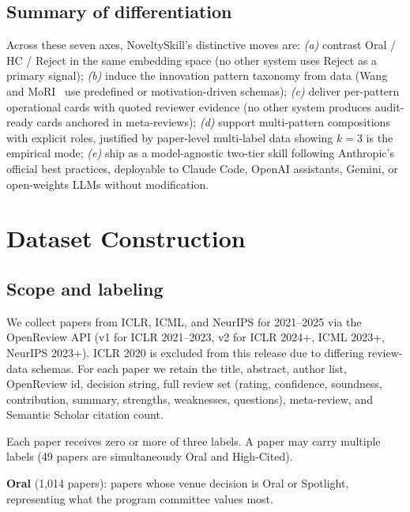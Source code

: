 \documentclass[10pt,a4paper]{article}
\begin{document}
\subsection{Summary of differentiation}

Across these seven axes, NoveltySkill's distinctive moves are: \emph{(a)} contrast Oral / HC / Reject in the same embedding space (no other system uses Reject as a primary signal); \emph{(b)} induce the innovation pattern taxonomy from data (Wang~\cite{wang2024scireasoning} and MoRI~\cite{moRI2026} use predefined or motivation-driven schemas); \emph{(c)} deliver per-pattern operational cards with quoted reviewer evidence (no other system produces audit-ready cards anchored in meta-reviews); \emph{(d)} support multi-pattern compositions with explicit roles, justified by paper-level multi-label data showing \(k{=}3\) is the empirical mode; \emph{(e)} ship as a model-agnostic two-tier skill following Anthropic's official best practices, deployable to Claude Code, OpenAI assistants, Gemini, or open-weights LLMs without modification.


\section{Dataset Construction}
\label{sec:data}

\subsection{Scope and labeling}

We collect papers from ICLR, ICML, and NeurIPS for 2021--2025 via the OpenReview API (v1 for ICLR 2021--2023, v2 for ICLR 2024+, ICML 2023+, NeurIPS 2023+). ICLR 2020 is excluded from this release due to differing review-data schemas. For each paper we retain the title, abstract, author list, OpenReview id, decision string, full review set (rating, confidence, soundness, contribution, summary, strengths, weaknesses, questions), meta-review, and Semantic Scholar citation count.

Each paper receives zero or more of three labels. A paper may carry multiple labels (49 papers are simultaneously Oral and High-Cited).

\textbf{\textcolor{cblue}{Oral}} (1{,}014 papers): papers whose venue decision is Oral or Spotlight, representing what the program committee values most.
\end{document}

